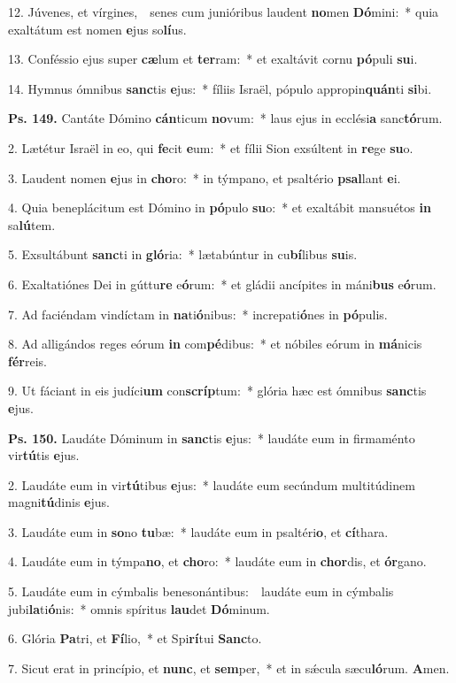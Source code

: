 12. Júvenes, et vírgines,~\GreDagger\ senes cum junióribus laudent \textbf{no}men \textbf{Dó}mini:~* quia exaltátum est nomen \textbf{e}jus so\textbf{lí}us.

13. Conféssio ejus super \textbf{cæ}lum et \textbf{ter}ram:~* et exaltávit cornu \textbf{pó}puli \textbf{su}i.

14. Hymnus ómnibus \textbf{sanc}tis \textbf{e}jus:~* fíliis Israël, pópulo appropin\textbf{quán}ti \textbf{si}bi.

\textbf{Ps. 149.} Cantáte Dómino \textbf{cán}ticum \textbf{no}vum:~* laus ejus in ecclési\textbf{a} sanc\textbf{tó}rum.

2. Lætétur Israël in eo, qui \textbf{fe}cit \textbf{e}um:~* et fílii Sion exsúltent in \textbf{re}ge \textbf{su}o.

3. Laudent nomen \textbf{e}jus in \textbf{cho}ro:~* in týmpano, et psaltério \textbf{psal}lant \textbf{e}i.

4. Quia beneplácitum est Dómino in \textbf{pó}pulo \textbf{su}o:~* et exaltábit mansuétos \textbf{in} sa\textbf{lú}tem.

5. Exsultábunt \textbf{sanc}ti in \textbf{gló}ria:~* lætabúntur in cu\textbf{bí}libus \textbf{su}is.

6. Exaltatiónes Dei in gúttu\textbf{re} e\textbf{ó}rum:~* et gládii ancípites in máni\textbf{bus} e\textbf{ó}rum.

7. Ad faciéndam vindíctam in \textbf{na}ti\textbf{ó}nibus:~* increpati\textbf{ó}nes in \textbf{pó}pulis.

8. Ad alligándos reges eórum \textbf{in} com\textbf{pé}dibus:~* et nóbiles eórum in \textbf{má}nicis \textbf{fér}reis.

9. Ut fáciant in eis judíci\textbf{um} con\textbf{scríp}tum:~* glória hæc est ómnibus \textbf{sanc}tis \textbf{e}jus.

\textbf{Ps. 150.} Laudáte Dóminum in \textbf{sanc}tis \textbf{e}jus:~* laudáte eum in firmaménto vir\textbf{tú}tis \textbf{e}jus.

2. Laudáte eum in vir\textbf{tú}tibus \textbf{e}jus:~* laudáte eum secúndum multitúdinem magni\textbf{tú}dinis \textbf{e}jus.

3. Laudáte eum in \textbf{so}no \textbf{tu}bæ:~* laudáte eum in psaltéri\textbf{o}, et \textbf{cí}thara.

4. Laudáte eum in týmpa\textbf{no}, et \textbf{cho}ro:~* laudáte eum in \textbf{chor}dis, et \textbf{ór}gano.

5. Laudáte eum in cýmbalis benesonántibus:~\GreDagger\ laudáte eum in cýmbalis jubi\textbf{la}ti\textbf{ó}nis:~* omnis spíritus \textbf{lau}det \textbf{Dó}minum.

6. Glória \textbf{Pa}tri, et \textbf{Fí}lio,~* et Spi\textbf{rí}tui \textbf{Sanc}to.

7. Sicut erat in princípio, et \textbf{nunc}, et \textbf{sem}per,~* et in s\'{\ae}cula sæcu\textbf{ló}rum. \textbf{A}men.